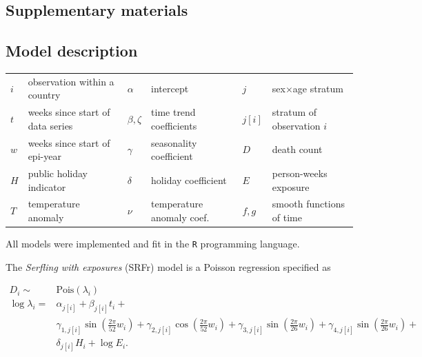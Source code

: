 \documentclass[12pt]{article}
\begin{document}
\clearpage




\clearpage


\renewcommand\thefigure{S.\arabic{figure}}
\setcounter{figure}{0}

\begin{appendix}

\section*{Supplementary materials}

\subsection*{Model description}

\begin{tabular}{llllll}
$i$ & observation within a country & $\alpha$ & intercept & $j$ & sex$\times$age stratum \\
$t$ & weeks since start of data series & $\beta, \zeta$ & time trend coefficients & $j[i]$ & stratum of observation $i$ \\
$w$ & weeks since start of epi-year & $\gamma$ & seasonality coefficient & $D$ & death count \\
$H$ & public holiday indicator & $\delta$ & holiday coefficient & $E$ & person-weeks exposure \\
$T$ & temperature anomaly & $\nu$ & temperature anomaly coef. & $f,g$ & smooth functions of time
\end{tabular}

\vspace{1em}

All models were implemented and fit in the \texttt{R} programming language.

The \emph{Serfling with exposures} (SRFr) model is a Poisson regression specified as

\begin{equation}
\begin{aligned}
  D_i \sim& \text{Pois}(\lambda_i) \\
  \log \lambda_i =& \alpha_{j[i]} + \beta_{j[i]}t_i + \\
& \gamma_{1,j[i]}\sin\left(\frac{2\pi}{52}w_i\right) +
  \gamma_{2,j[i]}\cos\left(\frac{2\pi}{52}w_i\right) +
  \gamma_{3,j[i]}\sin\left(\frac{2\pi}{26}w_i\right) +
  \gamma_{4,j[i]}\sin\left(\frac{2\pi}{26}w_i\right) + \\
 & \delta_{j[i]}H_i + \log E_i.
\end{aligned}
\label{eq:srfr}
\end{equation}


\end{appendix}
\end{document}
